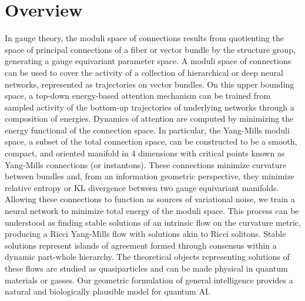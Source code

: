 \documentclass{article}
\begin{document}
\section{Overview}
In gauge theory, the moduli space of connections results from quotienting the space of principal connections of a fiber or vector bundle by the structure group, generating a gauge equivariant parameter space. A moduli space of connections can be used to cover the activity of a collection of hierarchical or deep neural networks, represented as trajectories on vector bundles. On this upper bounding space, a top-down energy-based attention mechanism can be trained from sampled activity of the bottom-up trajectories of underlying networks through a composition of energies. Dynamics of attention are computed by minimizing the energy functional of the connection space. In particular, the Yang-Mills moduli space, a subset of the total connection space, can be constructed to be a smooth, compact, and oriented manifold in 4 dimensions with critical points known as Yang-Mills connections (or instantons). These connections minimize curvature between bundles and, from an information geometric perspective, they minimize relative entropy or KL divergence between two gauge equivariant manifolds. Allowing these connections to function as sources of variational noise, we train a neural network to minimize total energy of the moduli space. This process can be understood as finding stable solutions of an intrinsic flow on the curvature metric, producing a Ricci Yang-Mills flow with solutions akin to Ricci solitons. Stable solutions represent islands of agreement formed through consensus within a dynamic part-whole hierarchy. The theoretical objects representing solutions of these flows are studied as quasiparticles and can be made physical in quantum materials or gasses. Our geometric formulation of general intelligence provides a natural and biologically plausible model for quantum AI. 

\end{document}
